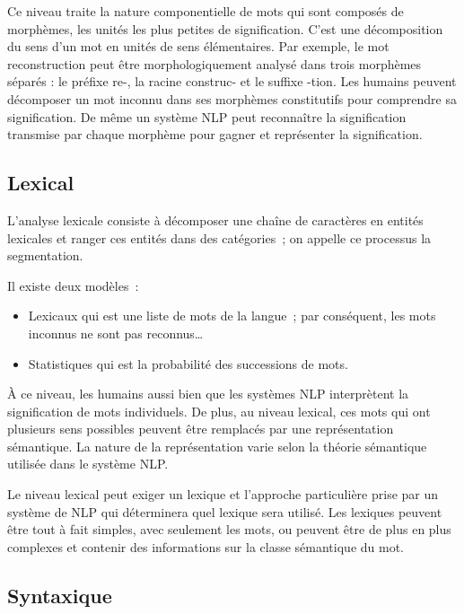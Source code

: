 Ce niveau traite la nature componentielle de mots qui sont composés de morphèmes, les unités les plus petites de signification. C’est une décomposition du sens d'un mot en unités de sens élémentaires. Par exemple, le mot reconstruction peut être morphologiquement analysé dans trois morphèmes séparés : le préfixe re-, la racine construc- et le suffixe -tion. Les humains peuvent décomposer un mot inconnu dans ses morphèmes constitutifs pour comprendre sa signification. De même un système NLP peut reconnaître la signification transmise par chaque morphème pour gagner et représenter la signification.

\subsection{Lexical}

	L’analyse lexicale consiste à décomposer une chaîne de caractères en entités lexicales et ranger ces entités dans des catégories ;  on appelle ce processus la segmentation.
\vspace{1em}
	
Il existe deux modèles :
\vspace{1em}

\begin{itemize}
	\item Lexicaux qui est une liste de mots de la langue ; par conséquent,  les mots inconnus ne sont pas reconnus… 
	\item Statistiques qui est la probabilité des successions de mots.
\end{itemize}
\vspace{1em}

À ce niveau, les humains aussi bien que les systèmes NLP  interprètent la signification de mots individuels. De plus, au niveau lexical, ces mots qui ont plusieurs sens possibles peuvent être remplacés par une représentation sémantique. La nature de la représentation varie selon la théorie sémantique utilisée dans le système NLP. 
\vspace{1em}

	Le niveau lexical peut exiger un lexique et l'approche particulière prise par un système de NLP qui déterminera quel lexique sera utilisé. Les lexiques peuvent être tout à fait simples, avec seulement les mots, ou peuvent être de plus en plus complexes et contenir des informations sur la classe sémantique du mot. 

\subsection{Syntaxique}

